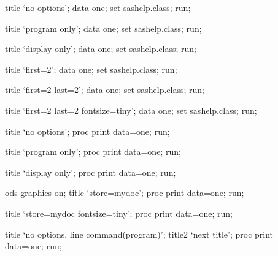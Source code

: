 \documentclass{article}
\begin{document}
\begin{Datastep}
title `no options';
data one;
  set sashelp.class;
run;
\end{Datastep}

\begin{Datastep}[program]
title `program only';
data one;
  set sashelp.class;
run;
\end{Datastep}

\begin{Datastep}[display]
title `display only';
data one;
  set sashelp.class;
run;
\end{Datastep}

\begin{Datastep}[first=2]
title `first=2';
data one;
  set sashelp.class;
run;
\end{Datastep}

\begin{Datastep}[first=2, last=2]
title `first=2 last=2';
data one;
  set sashelp.class;
run;
\end{Datastep}

\begin{Datastep}[first=2, last=2, fontsize=tiny]
title `first=2 last=2 fontsize=tiny';
data one;
  set sashelp.class;
run;
\end{Datastep}

\begin{Sascode}
title `no options';
proc print data=one;
run;
\end{Sascode}

\begin{Sascode}[program]
title `program only';
proc print data=one;
run;
\end{Sascode}

\begin{Sascode}[display]
title `display only';
proc print data=one;
run;
\end{Sascode}


\begin{Sascode}[store=mydoc]
ods graphics on;
title `store=mydoc';
proc print data=one;
run;
\end{Sascode}

\begin{Sascode}[store=mydoc0, fontsize=tiny]
title `store=mydoc fontsize=tiny';
proc print data=one;
run;
\end{Sascode}

\begin{Sascode}
title `no options, line command(program)';
title2 `next title';
proc print data=one;
run;
\end{Sascode}
\end{document}
